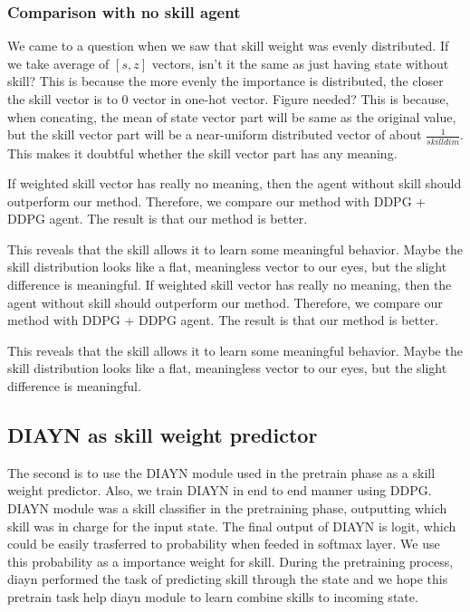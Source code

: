 \subsubsection{Comparison with no skill agent}

We came to a question when we saw that skill weight was evenly distributed.
If we take average of ${[s,z]}$ vectors, isn't it the same as just having state without skill?
This is because the more evenly the importance is distributed, the closer the skill vector is to 0 vector in one-hot vector. Figure needed?
This is because, when concating, the mean of state vector part will be same as the original value,
but the skill vector part will be a near-uniform distributed vector of about $\frac{1}{skilldim}$.
This makes it doubtful whether the skill vector part has any meaning.

If weighted skill vector has really no meaning, then the agent without skill should outperform our method.
Therefore, we compare our method with DDPG + DDPG agent. The result is that our method is better.

This reveals that the skill allows it to learn some meaningful behavior.
Maybe the skill distribution looks like a flat, meaningless vector to our eyes, but the slight difference is meaningful.
If weighted skill vector has really no meaning, then the agent without skill should outperform our method.
Therefore, we compare our method with DDPG + DDPG agent. The result is that our method is better.

This reveals that the skill allows it to learn some meaningful behavior.
Maybe the skill distribution looks like a flat, meaningless vector to our eyes, but the slight difference is meaningful.

\subsection{DIAYN as skill weight predictor}
The second is to use the DIAYN module used in the pretrain phase as a skill weight predictor.
Also, we train DIAYN in end to end manner using DDPG.
DIAYN module was a skill classifier in the pretraining phase, outputting which skill was in charge for the input state.
The final output of DIAYN is logit, which could be easily trasferred to probability when feeded in softmax layer.
We use this probability as a importance weight for skill. 
During the pretraining process, diayn performed the task of predicting skill through the state and we hope 
this pretrain task help diayn module to learn combine skills  to incoming state.

